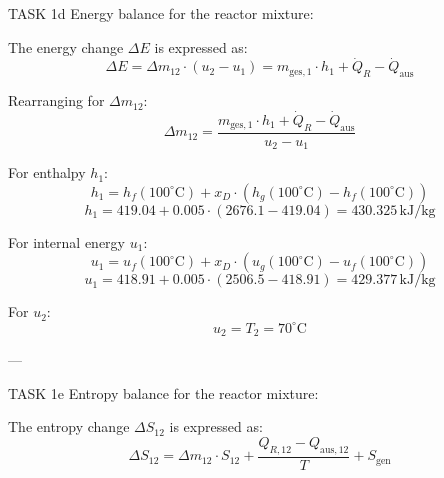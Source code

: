 TASK 1d  
Energy balance for the reactor mixture:  

The energy change \( \Delta E \) is expressed as:  
\[
\Delta E = \Delta m_{12} \cdot (u_2 - u_1) = m_{\text{ges},1} \cdot h_1 + \dot{Q}_R - \dot{Q}_{\text{aus}}
\]  

Rearranging for \( \Delta m_{12} \):  
\[
\Delta m_{12} = \frac{m_{\text{ges},1} \cdot h_1 + \dot{Q}_R - \dot{Q}_{\text{aus}}}{u_2 - u_1}
\]  

For enthalpy \( h_1 \):  
\[
h_1 = h_f(100^\circ\text{C}) + x_D \cdot (h_g(100^\circ\text{C}) - h_f(100^\circ\text{C}))
\]  
\[
h_1 = 419.04 + 0.005 \cdot (2676.1 - 419.04) = 430.325 \, \text{kJ/kg}
\]  

For internal energy \( u_1 \):  
\[
u_1 = u_f(100^\circ\text{C}) + x_D \cdot (u_g(100^\circ\text{C}) - u_f(100^\circ\text{C}))
\]  
\[
u_1 = 418.91 + 0.005 \cdot (2506.5 - 418.91) = 429.377 \, \text{kJ/kg}
\]  

For \( u_2 \):  
\[
u_2 = T_2 = 70^\circ\text{C}
\]  

---

TASK 1e  
Entropy balance for the reactor mixture:  

The entropy change \( \Delta S_{12} \) is expressed as:  
\[
\Delta S_{12} = \Delta m_{12} \cdot S_{12} + \frac{Q_{R,12} - Q_{\text{aus},12}}{T} + S_{\text{gen}}
\]